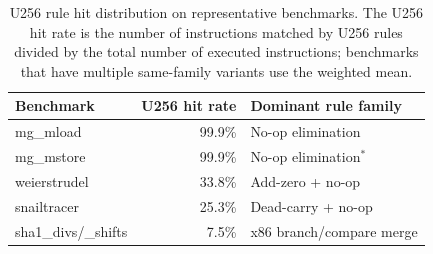 \begin{table}[t]
\centering
\caption{U256 rule hit distribution on representative benchmarks. The
U256 hit rate is the number of instructions matched by U256 rules
divided by the total number of executed instructions; benchmarks that
have multiple same-family variants use the weighted mean.}
\label{tab:family-attribution}
\footnotesize
\begin{tabular}{@{}lrl@{}}
\toprule
Benchmark & U256 hit rate & Dominant rule family \\
\midrule
mg\_mload              & 99.9\% & No-op elimination \\
mg\_mstore             & 99.9\% & No-op elimination$^*$ \\
weierstrudel           & 33.8\% & Add-zero + no-op \\
snailtracer            & 25.3\% & Dead-carry + no-op \\
sha1\_divs/\_shifts    &  7.5\% & x86 branch/compare merge \\
\bottomrule
\end{tabular}
\vspace{2pt}
\par{}
\end{table}
